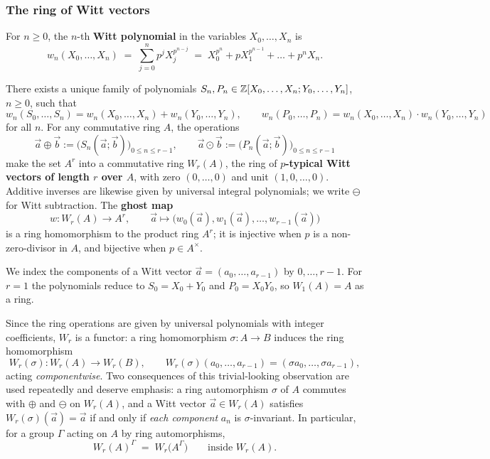 \subsubsection*{The ring of Witt vectors}

For $n \geq 0$, the $n$-th \textbf{Witt polynomial} in the variables $X_0, \dots, X_n$
is
\[
w_n(X_0, \dots, X_n) \;=\; \sum_{j=0}^{n} p^j X_j^{p^{n-j}}
\;=\; X_0^{p^n} + p X_1^{p^{n-1}} + \dots + p^n X_n .
\]

\begin{theorem}
\label{theorem:witt_ring_structure:reorg}
There exists a unique family of polynomials
$S_n, P_n \in \mathbb{Z}[X_0, \dots, X_n; Y_0, \dots, Y_n]$, $n \geq 0$, such that
\[
w_n(S_0, \dots, S_n) = w_n(X_0,\dots,X_n) + w_n(Y_0,\dots,Y_n),
\qquad
w_n(P_0, \dots, P_n) = w_n(X_0,\dots,X_n) \cdot w_n(Y_0,\dots,Y_n)
\]
for all $n$. For any commutative ring $A$, the operations
\[
\vec a \oplus \vec b := \bigl(S_n(\vec a; \vec b)\bigr)_{0 \le n \le r-1},
\qquad
\vec a \odot \vec b := \bigl(P_n(\vec a; \vec b)\bigr)_{0 \le n \le r-1}
\]
make the set $A^r$ into a commutative ring $W_r(A)$, the ring of \textbf{$p$-typical
Witt vectors of length $r$ over $A$}, with zero $(0, \dots, 0)$ and unit
$(1, 0, \dots, 0)$. Additive inverses are likewise given by universal integral
polynomials; we write $\ominus$ for Witt subtraction. The \textbf{ghost map}
\[
w \colon W_r(A) \longrightarrow A^r,
\qquad
\vec a \longmapsto \bigl(w_0(\vec a), w_1(\vec a), \dots, w_{r-1}(\vec a)\bigr)
\]
is a ring homomorphism to the product ring $A^r$; it is injective when $p$ is a
non-zero-divisor in $A$, and bijective when $p \in A^\times$.
\end{theorem}

We index the components of a Witt vector $\vec a = (a_0, \dots, a_{r-1})$ by
$0, \dots, r-1$. For $r = 1$ the polynomials reduce to $S_0 = X_0 + Y_0$ and
$P_0 = X_0 Y_0$, so $W_1(A) = A$ as a ring.

Since the ring operations are given by universal polynomials with integer
coefficients, $W_r$ is a functor: a ring homomorphism $\sigma \colon A \to B$ induces
the ring homomorphism
\[
W_r(\sigma) \colon W_r(A) \to W_r(B),
\qquad
W_r(\sigma)(a_0, \dots, a_{r-1}) = (\sigma a_0, \dots, \sigma a_{r-1}),
\]
acting \emph{componentwise}. Two consequences of this trivial-looking observation are
used repeatedly and deserve emphasis: a ring automorphism $\sigma$ of $A$ commutes
with $\oplus$ and $\ominus$ on $W_r(A)$, and a Witt vector $\vec a \in W_r(A)$
satisfies $W_r(\sigma)(\vec a) = \vec a$ if and only if \emph{each component} $a_n$ is
$\sigma$-invariant. In particular, for a group $\Gamma$ acting on $A$ by ring
automorphisms,
\begin{equation}\label{eq:witt_invariants_componentwise:reorg}
W_r(A)^{\Gamma} \;=\; W_r\bigl(A^{\Gamma}\bigr)
\qquad \text{inside } W_r(A).
\end{equation}

